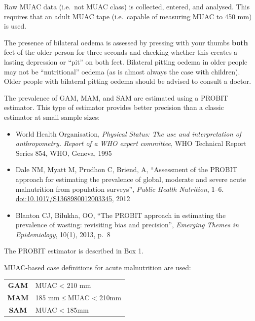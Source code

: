 \documentclass[12pt,a4paper]{book}
\theoremstyle{definition}
\theoremstyle{definition}
\theoremstyle{definition}
\theoremstyle{remark}
\begin{document}
Raw MUAC data (i.e.~not MUAC class) is collected, entered, and analysed.
This requires that an adult MUAC tape (i.e.~capable of measuring MUAC to
450 mm) is used.

The presence of bilateral oedema is assessed by pressing with your
thumbs \textbf{both} feet of the older person for three seconds and
checking whether this creates a lasting depression or ``pit'' on both
feet. Bilateral pitting oedema in older people may not be
``nutritional'' oedema (as is almost always the case with children).
Older people with bilateral pitting oedema should be advised to consult
a doctor.

The prevalence of GAM, MAM, and SAM are estimated using a PROBIT
estimator. This type of estimator provides better precision than a
classic estimator at small sample sizes:

\begin{itemize}
\item
  World Health Organisation, \emph{Physical Status: The use and
  interpretation of anthropometry. Report of a WHO expert committee},
  WHO Technical Report Series 854, WHO, Geneva, 1995
\item
  Dale NM, Myatt M, Prudhon C, Briend, A, ``Assessment of the PROBIT
  approach for estimating the prevalence of global, moderate and severe
  acute malnutrition from population surveys'', \emph{Public Health
  Nutrition}, 1--6. \url{doi:10.1017/S1368980012003345}, 2012
\item
  Blanton CJ, Bilukha, OO, ``The PROBIT approach in estimating the
  prevalence of wasting: revisiting bias and precision'', \emph{Emerging
  Themes in Epidemiology}, 10(1), 2013, p.~8
\end{itemize}

The PROBIT estimator is described in Box 1.

MUAC-based case definitions for acute malnutrition are used:

\begin{longtable}[]{@{}cl@{}}
\toprule
\begin{minipage}[t]{0.48\columnwidth}\centering
\textbf{GAM}\strut
\end{minipage} & \begin{minipage}[t]{0.48\columnwidth}\raggedright
MUAC \textless{} 210 mm\strut
\end{minipage}\tabularnewline
\begin{minipage}[t]{0.48\columnwidth}\centering
\textbf{MAM}\strut
\end{minipage} & \begin{minipage}[t]{0.48\columnwidth}\raggedright
185 mm ≤ MUAC \textless{} 210mm\strut
\end{minipage}\tabularnewline
\begin{minipage}[t]{0.48\columnwidth}\centering
\textbf{SAM}\strut
\end{minipage} & \begin{minipage}[t]{0.48\columnwidth}\raggedright
MUAC \textless{} 185mm\strut
\end{minipage}\tabularnewline
\bottomrule
\end{longtable}
\end{document}
